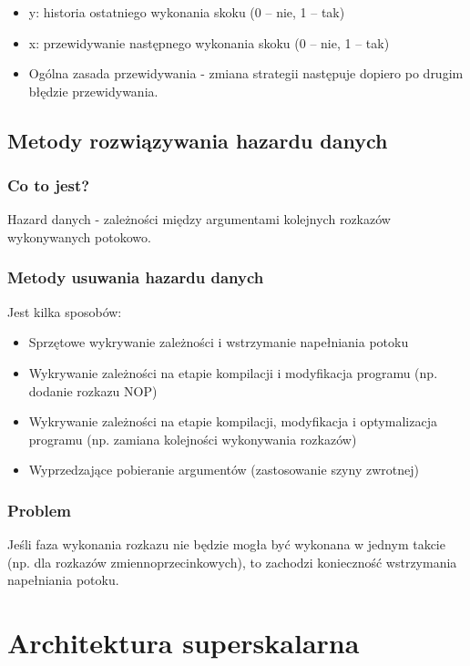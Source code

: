 \begin{enumerate}
\begin{itemize}
\begin{itemize}
	   				\begin{itemize}
	   					\item y: historia ostatniego wykonania skoku (0 – nie, 1 – tak)
	   					\item x: przewidywanie następnego wykonania skoku (0 – nie, 1 – tak)
	   					\item Ogólna zasada przewidywania - zmiana strategii następuje dopiero po drugim błędzie przewidywania.
	   				\end{itemize}
	   			\end{itemize}
	   		\end{itemize}
	   	\end{enumerate}

	\subsection{Metody rozwiązywania hazardu danych}
		\subsubsection{Co to jest?}
			Hazard danych - zależności między argumentami kolejnych rozkazów wykonywanych potokowo.
		\subsubsection{Metody usuwania hazardu danych}
			Jest kilka sposobów:
			\begin{itemize}
			   		\item Sprzętowe wykrywanie zależności i wstrzymanie napełniania potoku
			   		\item Wykrywanie zależności na etapie kompilacji i modyfikacja programu (np. dodanie rozkazu NOP)
			   		\item Wykrywanie zależności na etapie kompilacji, modyfikacja i optymalizacja programu (np. zamiana kolejności wykonywania rozkazów)
			   		\item Wyprzedzające pobieranie argumentów (zastosowanie szyny zwrotnej)
			\end{itemize}
		\subsubsection{Problem}
			Jeśli faza wykonania rozkazu nie będzie mogła być wykonana w jednym takcie (np. dla rozkazów zmiennoprzecinkowych), to zachodzi konieczność wstrzymania napełniania potoku.
        	

\section{Architektura superskalarna}
